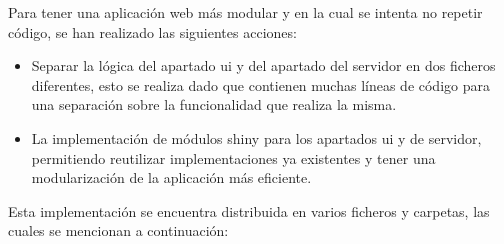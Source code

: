 \documentclass[../../main.tex]{subfiles}
\begin{document}
Para tener una aplicación web más modular y en la cual se intenta no repetir código, se han realizado las siguientes acciones:

\begin{itemize}
    \item Separar la lógica del apartado \gls{ui} y del apartado del servidor en dos ficheros diferentes, esto se realiza dado que contienen muchas líneas de código para una separación sobre la funcionalidad que realiza la misma.
    \item La implementación de módulos \gls{shiny} para los apartados \gls{ui} y de servidor, permitiendo reutilizar implementaciones ya existentes y tener una modularización de la aplicación más eficiente.
\end{itemize}

Esta implementación se encuentra distribuida en varios ficheros y carpetas, las cuales se mencionan a continuación:
\end{document}
